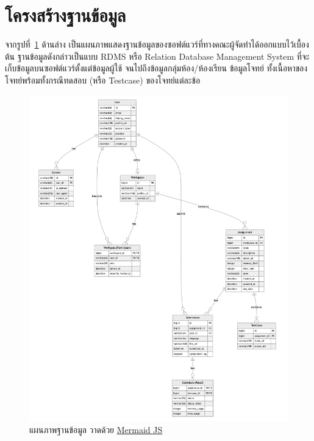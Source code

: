 \documentclass[12pt,one side,openright,a4paper]{cpe-thesis-th}
\newcommand{\thaijustify}[1]{%
  \par\hspace{30pt}\justifying
  #1
}
\begin{document}
\section{โครงสร้างฐานข้อมูล}
    \thaijustify{
        จากรูปที่~\ref{fig:database} ด้านล่าง เป็นแผนภาพแสดงฐานข้อมูลของซอฟต์แวร์ที่ทางคณะผู้จัดทำได้ออกแบบไว้เบื้องต้น ฐานข้อมูลดังกล่าวเป็นแบบ RDMS หรือ Relation Database Management System ที่จะเก็บข้อมูลบนซอฟต์แวร์ตั้งแต่ข้อมูลผู้ใช้ จนไปถึงข้อมูลกลุ่มห้อง/ห้องเรียน ข้อมูลโจทย์ ทั้งเนื้อหาของโจทย์พร้อมทั้งกรณีทดสอบ (หรือ Testcase) ของโจทย์แต่ละข้อ
    }
    \hypertarget{database}{
        \begin{figure}[H]
        \centering
            \includegraphics[width=15cm]{figure/diagram/database-v3.png}
            \caption[แผนภาพฐานข้อมูล]{แผนภาพฐานข้อมูล วาดด้วย \href{https://mermaid.js.org/}{Mermaid JS}}
            \label{fig:database}
        \end{figure}
    }
    \pagebreak
\end{document}
